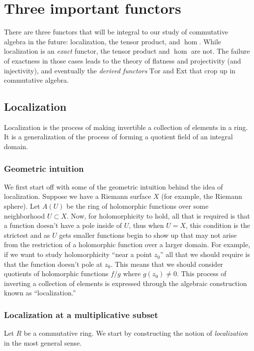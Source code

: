
\chapter{Three important functors}

There are three functors that will be integral to our study of commutative
algebra in the future: localization, the tensor product, and $\hom$.
While localization is an \emph{exact} functor, the tensor product and $\hom$
are not. The failure of exactness in those cases leads to the theory of
flatness and projectivity (and injectivity), and eventually the \emph{derived functors}
$\mathrm{Tor}$ and $\mathrm{Ext}$ that crop up in commutative algebra.

\section{Localization}

Localization is the process of making invertible a collection of elements in a
ring. It is a generalization of the process of forming a quotient field of an
integral domain.

\subsection{Geometric intuition}
We first start off with some of the geometric intuition behind the idea of
localization. Suppose we have a Riemann surface $X$ (for example, the Riemann
sphere). Let $A(U)$ be the ring of holomorphic functions over some neighborhood
$U\subset X$. Now, for holomorphicity to hold, all that is required is
that a function doesn't have a pole inside of $U$, thus when $U=X$, this
condition is the strictest and as $U$ gets smaller functions begin to show
up that may not arise from the restriction of a holomorphic function over
a larger domain. For example, if we want to study holomorphicity ``near a
point $z_0$'' all that we should require is that the function doesn't pole at
$z_0$. This means that we should consider quotients of holomorphic functions
$f/g$ where $g(z_0)\neq 0$. This process of inverting a collection of elements
is expressed through the algebraic construction known as ``localization.''


\subsection{Localization at a multiplicative subset}

Let $R$ be a commutative ring.
We start by constructing the notion of \emph{localization} in the most general
sense.


